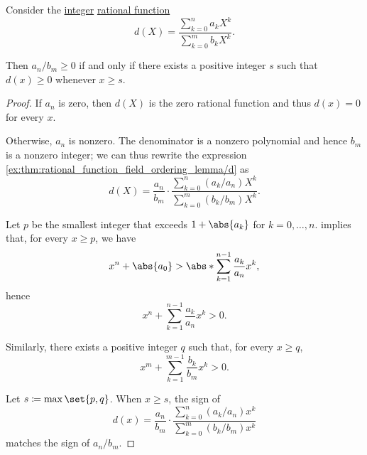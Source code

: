 \begin{lemma}\label{thm:rational_function_field_ordering_lemma}
  Consider the \hyperref[def:integers]{integer} \hyperref[def:rational_function_field]{rational function}
  \begin{equation}\label{ex:thm:rational_function_field_ordering_lemma/d}
    d(X) = \frac {\sum_{k=0}^n a_k X^k} {\sum_{k=0}^m b_k X^k}.
  \end{equation}

  Then \( {a_n} / {b_m} \geq 0 \) if and only if there exists a positive integer \( s \) such that \( d(x) \geq 0 \) whenever \( x \geq s \).
\end{lemma}
\begin{proof}
  If \( a_n \) is zero, then \( d(X) \) is the zero rational function and thus \( d(x) = 0 \) for every \( x \).

  Otherwise, \( a_n \) is nonzero. The denominator is a nonzero polynomial and hence \( b_m \) is a nonzero integer; we can thus rewrite the expression \eqref{ex:thm:rational_function_field_ordering_lemma/d} as
  \begin{equation*}
    d(X) = \frac {a_n} {b_m} \cdot \frac {\sum_{k=0}^n (a_k / a_n) X^k} {\sum_{k=0}^m (b_k / b_m) X^k}.
  \end{equation*}

  Let \( p \) be the smallest integer that exceeds \( 1 + \abs{a_k} \) for \( k = 0, \ldots, n \).  implies that, for every \( x \geq p \), we have
  \begin{equation*}
    x^n + \abs{a_0} > \abs*{\sum_{k=1}^{n-1} \frac {a_k} {a_n} x^k},
  \end{equation*}
  hence
  \begin{equation*}
    x^n + \sum_{k=1}^{n-1} \frac {a_k} {a_n} x^k > 0.
  \end{equation*}

  Similarly, there exists a positive integer \( q \) such that, for every \( x \geq q \),
  \begin{equation*}
    x^m + \sum_{k=1}^{m-1} \frac {b_k} {b_m} x^k > 0.
  \end{equation*}

  Let \( s \coloneqq \max\set{ p, q } \). When \( x \geq s \), the sign of
  \begin{equation*}
    d(x) = \frac {a_n} {b_m} \cdot \frac {\sum_{k=0}^n (a_k / a_n) x^k} {\sum_{k=0}^m (b_k / b_m) x^k}
  \end{equation*}
  matches the sign of \( a_n / b_m \).
\end{proof}


